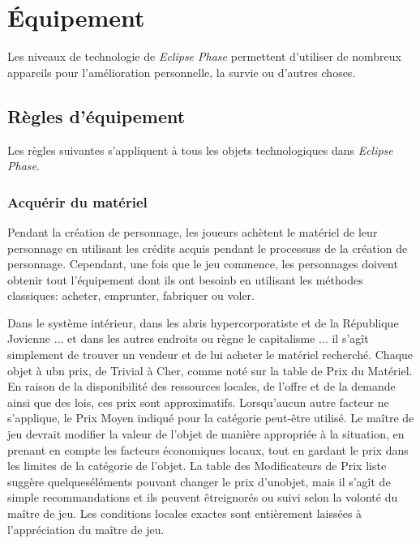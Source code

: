 



\chapter{Équipement} \label{cha:gear} 

Les niveaux de technologie de \emph{Eclipse Phase} permettent d'utiliser de nombreux appareils pour l'amélioration personnelle, la survie ou d'autres choses. 



\section{Règles d'équipement} \label{sec:equipment-rules} 

Les règles suivantes s'appliquent à tous les objets technologiques dans \emph{Eclipse Phase}. 



\subsection{Acquérir du matériel} \label{sec:acquiring-gear} 

Pendant la création de personnage, les joueurs achètent le matériel de leur personnage en utilisant les crédits acquis pendant le processuss de la création de personnage. Cependant, une fois que le jeu commence, les personnages doivent obtenir tout l'équipement dont ils ont besoinb en utilisant les méthodes classiques: acheter, emprunter, fabriquer ou voler. 

Dans le système intérieur, dans les abris hypercorporatiste et de la République Jovienne ... et dans les autres endroits ou règne le capitalisme ... il s'agît simplement de trouver un vendeur et de lui acheter le matériel recherché. Chaque objet à ubn prix, de Trivial à Cher, comme noté sur la table de Prix du Matériel. En raison de la disponibilité des ressources locales, de l'offre et de la demande ainsi que des lois, ces prix sont approximatifs.  Lorsqu'aucun autre facteur ne s'applique, le Prix Moyen indiqué pour la catégorie peut-être utilisé. Le maître de jeu devrait modifier la valeur de l'objet de manière appropriée à la situation, en prenant en compte les facteurs économiques locaux, tout en gardant le prix dans les limites de la catégorie de l'objet. La table des Modificateurs de Prix liste suggère quelqueséléments pouvant changer le prix d'unobjet, mais il s'agît de simple recommandations et ils peuvent êtreignorés ou suivi selon la volonté du maître de jeu. Les conditions locales exactes sont entièrement laissées à l'appréciation du maître de jeu. 

